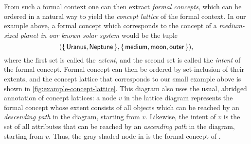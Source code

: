 From such a formal context one can then extract \emph{formal concepts}, which can be
ordered in a natural way to yield the \emph{concept lattice} of the formal context.  In
our example above, a formal concept which corresponds to the concept of a
\emph{medium-sized planet in our known solar system} would be the tuple
\begin{equation}
  \label{eq:60}
  ( {\{\, \mathsf{Uranus}, \mathsf{Neptune} \,\}}, {\{\, \mathsf{medium}, \mathsf{moon},
    \mathsf{outer} \,\}} ),
\end{equation}
where the first set is called the \emph{extent}, and the second set is called the
\emph{intent} of the formal concept.  Formal concept can then be ordered by set-inclusion
of their extents, and the concept lattice that corresponds to our small example above is
shown in \ref{fig:example-concept-lattice}.  This diagram also uses the usual, abridged
annotation of concept lattices: a node $v$ in the lattice diagram represents the formal
concept whose extent consists of all objects which can be reached by an \emph{descending
  path} in the diagram, starting from $v$.  Likewise, the intent of $v$ is the set of all
attributes that can be reached by an \emph{ascending path} in the diagram, starting from
$v$.  Thus, the gray-shaded node in  is the formal
concept of .

